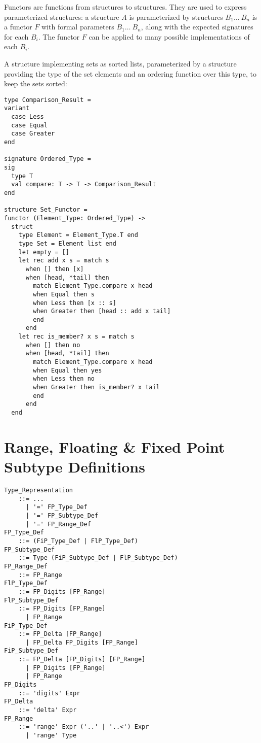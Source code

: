 Functors are functions from structures to structures. They are used to express parameterized structures: a structure $A$ is parameterized by structures $B_1 \ldots\ B_n$ is a functor $F$ with formal parameters $B_1 \ldots\ B_n$, along with the expected signatures for each $B_i$. The functor $F$ can be applied to many possible implementations of each $B_i$. 

\example A structure implementing sets as sorted lists, parameterized by a structure providing the type of the set elements and an ordering function over this type, to keep the sets sorted:
\begin{lstlisting}
type Comparison_Result = 
variant 
  case Less 
  case Equal
  case Greater 
end

signature Ordered_Type =
sig
  type T
  val compare: T -> T -> Comparison_Result
end

structure Set_Functor =
functor (Element_Type: Ordered_Type) ->
  struct
    type Element = Element_Type.T end
    type Set = Element list end
    let empty = []
    let rec add x s = match s
      when [] then [x]
      when [head, *tail] then 
        match Element_Type.compare x head
        when Equal then s
        when Less then [x :: s]
        when Greater then [head :: add x tail]
        end
      end
    let rec is_member? x s = match s
      when [] then no
      when [head, *tail] then 
        match Element_Type.compare x head
        when Equal then yes
        when Less then no
        when Greater then is_member? x tail
        end
      end
  end
\end{lstlisting}





\section{Range, Floating \& Fixed Point Subtype Definitions}
\label{sec:fl-fi-subtypes}

\grammar\begin{lstlisting}
Type_Representation 
    ::= ...
      | '=' FP_Type_Def
      | '=' FP_Subtype_Def 
      | '=' FP_Range_Def
FP_Type_Def
    ::= (FiP_Type_Def | FlP_Type_Def) 
FP_Subtype_Def 
    ::= Type (FiP_Subtype_Def | FlP_Subtype_Def) 
FP_Range_Def
    ::= FP_Range
FlP_Type_Def 
    ::= FP_Digits [FP_Range]
FlP_Subtype_Def 
    ::= FP_Digits [FP_Range]
      | FP_Range
FiP_Type_Def 
    ::= FP_Delta [FP_Range] 
      | FP_Delta FP_Digits [FP_Range]
FiP_Subtype_Def
    ::= FP_Delta [FP_Digits] [FP_Range]
      | FP_Digits [FP_Range]
      | FP_Range
FP_Digits
    ::= 'digits' Expr
FP_Delta 
    ::= 'delta' Expr
FP_Range 
    ::= 'range' Expr ('..' | '..<') Expr
      | 'range' Type
\end{lstlisting}

